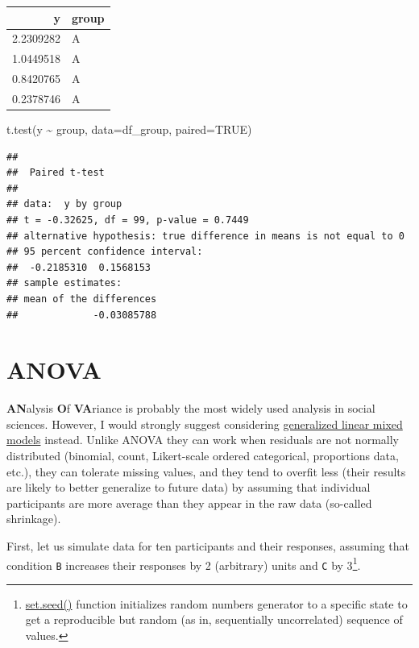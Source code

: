 \documentclass[
]{book}
\newenvironment{Shaded}{\begin{snugshade}}{\end{snugshade}}
\newcommand{\AttributeTok}[1]{\textcolor[rgb]{0.77,0.63,0.00}{#1}}
\newcommand{\ConstantTok}[1]{\textcolor[rgb]{0.00,0.00,0.00}{#1}}
\newcommand{\FunctionTok}[1]{\textcolor[rgb]{0.00,0.00,0.00}{#1}}
\newcommand{\NormalTok}[1]{#1}
\newcommand{\SpecialCharTok}[1]{\textcolor[rgb]{0.00,0.00,0.00}{#1}}
\begin{document}
\begin{tabular}{r|l}
\hline
y & group\\
\hline
2.2309282 & A\\
\hline
1.0449518 & A\\
\hline
0.8420765 & A\\
\hline
0.2378746 & A\\
\hline
\end{tabular}

\begin{Shaded}
\begin{Highlighting}[]
\FunctionTok{t.test}\NormalTok{(y }\SpecialCharTok{\textasciitilde{}}\NormalTok{ group, }\AttributeTok{data=}\NormalTok{df\_group, }\AttributeTok{paired=}\ConstantTok{TRUE}\NormalTok{)}
\end{Highlighting}
\end{Shaded}

\begin{verbatim}
## 
##  Paired t-test
## 
## data:  y by group
## t = -0.32625, df = 99, p-value = 0.7449
## alternative hypothesis: true difference in means is not equal to 0
## 95 percent confidence interval:
##  -0.2185310  0.1568153
## sample estimates:
## mean of the differences 
##             -0.03085788
\end{verbatim}

\hypertarget{anova}{%
\section{ANOVA}\label{anova}}

\textbf{AN}alysis \textbf{O}f \textbf{VA}riance is probably the most widely used analysis in social sciences. However, I would strongly suggest considering \protect\hyperlink{GLMM}{generalized linear mixed models} instead. Unlike ANOVA they can work when residuals are not normally distributed (binomial, count, Likert-scale ordered categorical, proportions data, etc.), they can tolerate missing values, and they tend to overfit less (their results are likely to better generalize to future data) by assuming that individual participants are more average than they appear in the raw data (so-called shrinkage).

First, let us simulate data for ten participants and their responses, assuming that condition \texttt{B} increases their responses by 2 (arbitrary) units and \texttt{C} by 3\footnote{\href{https://stat.ethz.ch/R-manual/R-devel/library/base/html/Random.html}{set.seed()} function initializes random numbers generator to a specific state to get a reproducible but random (as in, sequentially uncorrelated) sequence of values.}.
\end{document}
